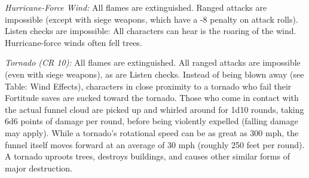 \documentclass{article}
\begin{document}
\textit{Hurricane-Force Wind: }All flames are extinguished. Ranged attacks are 
impossible (except with siege weapons, which have a -8 penalty on attack rolls). 
Listen checks are impossible: All characters can hear is the roaring of the wind. 
Hurricane-force winds often fell trees.

\textit{Tornado (CR 10): }All flames are extinguished. All ranged attacks are impossible 
(even with siege weapons), as are Listen checks. Instead of being blown away (see 
Table: Wind Effects), characters in close proximity to a tornado who fail their 
Fortitude saves are sucked toward the tornado. Those who come in contact with the 
actual funnel cloud are picked up and whirled around for 1d10 rounds, taking 6d6 
points of damage per round, before being violently expelled (falling damage may 
apply). While a tornado's rotational speed can be as great as 300 mph, the funnel 
itself moves forward at an average of 30 mph (roughly 250 feet per round). A tornado 
uproots trees, destroys buildings, and causes other similar forms of major destruction.
\end{document}
